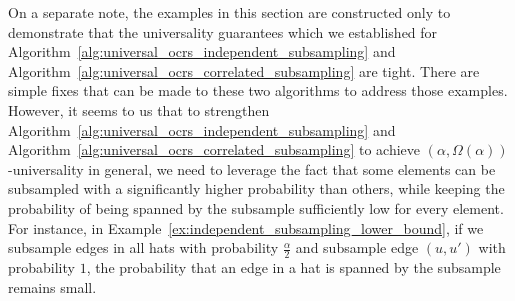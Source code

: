 \documentclass[11pt]{article}
\begin{document}
On a separate note, the examples in this section are constructed only to demonstrate that the universality guarantees which we established for Algorithm~\ref{alg:universal_ocrs_independent_subsampling} and Algorithm~\ref{alg:universal_ocrs_correlated_subsampling} are tight. There are simple fixes that can be made to these two algorithms to address those examples. However, it seems to us that to strengthen Algorithm~\ref{alg:universal_ocrs_independent_subsampling} and Algorithm~\ref{alg:universal_ocrs_correlated_subsampling} to achieve $(\alpha,\Omega(\alpha))$-universality in general, we need to leverage the fact that some elements can be subsampled with a significantly higher probability than others, while keeping the probability of being spanned by the subsample sufficiently low for every element. For instance, in Example~\ref{ex:independent_subsampling_lower_bound}, if we subsample edges in all hats with probability $\frac{\alpha}{2}$ and subsample edge $(u,u')$ with probability $1$, the probability that an edge in a hat is spanned by the subsample remains small.
\end{document}
